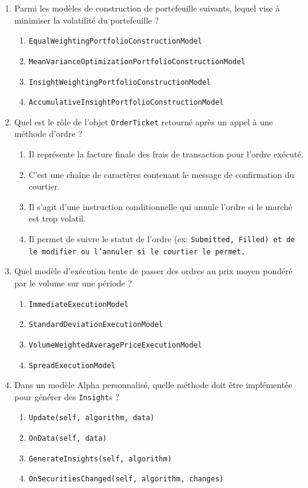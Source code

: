 \documentclass[a4paper,12pt]{article}
\begin{document}
\begin{enumerate}
    \item Parmi les modèles de construction de portefeuille suivants, lequel vise à minimiser la volatilité du portefeuille ?
    \begin{enumerate}[label=(\Alph*)]
        \item \texttt{EqualWeightingPortfolioConstructionModel}
        \item \texttt{MeanVarianceOptimizationPortfolioConstructionModel}
        \item \texttt{InsightWeightingPortfolioConstructionModel}
        \item \texttt{AccumulativeInsightPortfolioConstructionModel}
    \end{enumerate}

    \item Quel est le rôle de l'objet \texttt{OrderTicket} retourné après un appel à une méthode d'ordre ?
    \begin{enumerate}[label=(\Alph*)]
        \item Il représente la facture finale des frais de transaction pour l'ordre exécuté.
        \item C'est une chaîne de caractères contenant le message de confirmation du courtier.
        \item Il s'agit d'une instruction conditionnelle qui annule l'ordre si le marché est trop volatil.
        \item Il permet de suivre le statut de l'ordre (ex: \texttt{Submitted, \texttt{Filled}) et de le modifier ou l'annuler si le courtier le permet.}
    \end{enumerate}

    \item Quel modèle d'exécution tente de passer des ordres au prix moyen pondéré par le volume sur une période ?
    \begin{enumerate}[label=(\Alph*)]
        \item \texttt{ImmediateExecutionModel}
        \item \texttt{StandardDeviationExecutionModel}
        \item \texttt{VolumeWeightedAveragePriceExecutionModel}
        \item \texttt{SpreadExecutionModel}
    \end{enumerate}

    \item Dans un modèle Alpha personnalisé, quelle méthode doit être implémentée pour générer des \texttt{Insight}s ?
    \begin{enumerate}[label=(\Alph*)]
        \item \texttt{Update(self, algorithm, data)}
        \item \texttt{OnData(self, data)}
        \item \texttt{GenerateInsights(self, algorithm)}
        \item \texttt{OnSecuritiesChanged(self, algorithm, changes)}
    \end{enumerate}


\end{enumerate}
\end{document}
